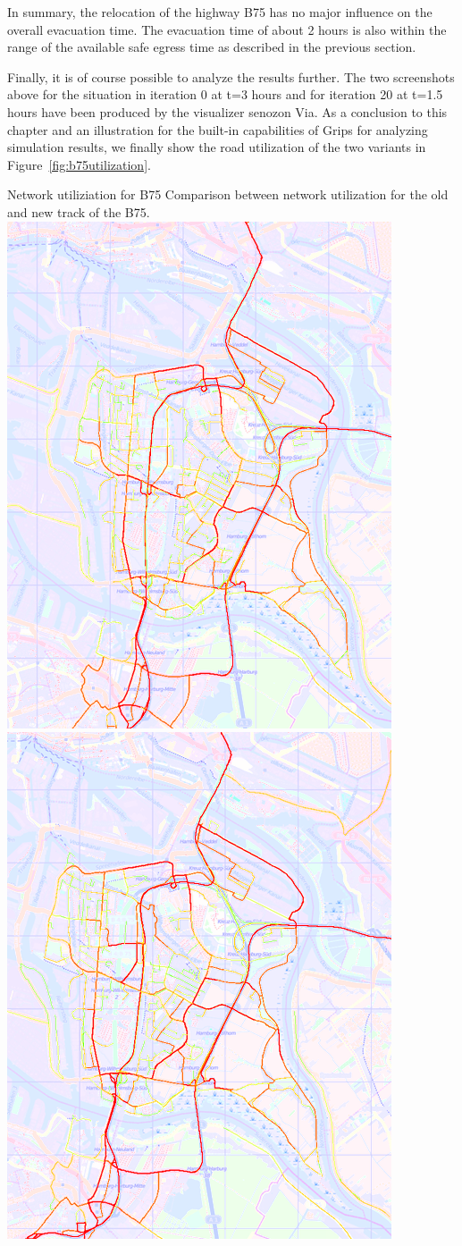 In summary, the relocation of the highway B75 has no major influence on the overall evacuation time. The evacuation time of about 2 hours is also within the range of the available safe egress time as described in the previous section. 

Finally, it is of course possible to analyze the results further. The two screenshots above for the situation in iteration 0 at t=3 hours and for iteration 20 at t=1.5 hours have been produced by the visualizer senozon Via.
As a conclusion to this chapter and an illustration for the built-in capabilities of Grips for analyzing simulation results, we finally show the road utilization of the two variants in Figure~\ref{fig:b75utilization}.


\createfigure%
{Network utiliziation for B75}%
{Comparison between network utilization for the old and new track of the B75.}%
{\label{fig:b75utilization}}%
{%
  \createsubfigure%
  {}%
  {\includegraphics[width=.475\linewidth]{using/figures/b75utilizationold}}%
  {}%
  {}%
  \createsubfigure%
  {}%
  {\includegraphics[width=.475\linewidth]{using/figures/b75utilizationnew}}
  {}%
  {}%
}%
  {}%
